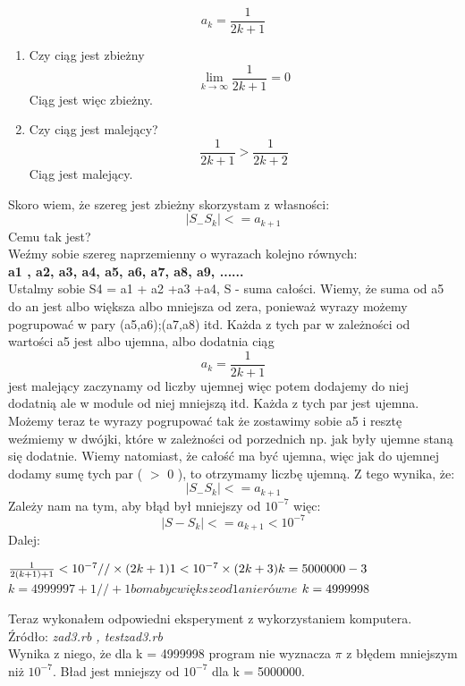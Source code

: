 \documentclass[fleqn]{article}
\begin{document}
\begin{enumerate}
  \[a_{k}=\frac{1}{2k+1}\]
   \begin{enumerate}
   \item Czy ciąg jest zbieżny
   \[\lim_{k \rightarrow \infty}\frac{1}{2k+1} = 0\]
   Ciąg jest więc zbieżny.
   \item Czy ciąg jest malejący?
   \[\frac{1}{2k+1} > \frac{1}{2k+2}\]
   Ciąg jest malejący.
   \end{enumerate}
   Skoro wiem, że szereg jest zbieżny skorzystam z własności:
   \[|S_ - S_{k}| <= a_{k+1}\]
   Cemu tak jest?\\
   Weźmy sobie szereg naprzemienny o wyrazach kolejno równych:\\ \textbf{a1 , a2, a3, a4, a5, a6, a7, a8, a9, ...... } \\
   Ustalmy sobie S4 = a1 + a2 +a3 +a4, S - suma całości. Wiemy, że suma od a5 do an jest albo większa albo mniejsza od zera, ponieważ wyrazy możemy pogrupować w pary (a5,a6);(a7,a8) itd. Każda z tych par w zależności od wartości a5 jest albo ujemna, albo dodatnia ciąg \[a_{k}=\frac{1}{2k+1}\] jest malejący zaczynamy od liczby ujemnej więc potem dodajemy do niej dodatnią ale w module od niej mniejszą itd. Każda z tych par jest ujemna. Możemy teraz te wyrazy pogrupować tak że zostawimy sobie a5 i resztę weźmiemy w dwójki, które w zależności od porzednich np. jak były ujemne staną się dodatnie. Wiemy natomiast, że całość ma być ujemna, więc jak do ujemnej dodamy sumę tych par ( $>$ 0 ), to otrzymamy liczbę ujemną. Z tego wynika, że:\[|S_ - S_{k}| <= a_{k+1}\]
   Zależy nam na tym, aby błąd był mniejszy od $10^{-7}$ więc:
   \[|S - S_{k}| <= a_{k+1} < 10^{-7}\]
   Dalej:\\
   \begin{center}
   $
   \frac{1}{2(k+1)+1} <10^{-7} //\times(2k+1)  \newline
   1 <10^{-7}\times(2k+3) \newline
   k = 5000000 - 3 \newline$ 
   $k = 4999997 + 1 //+1 bo ma byc większe od 1 a nie równe$ \newline
   $k = 4999998  \newline\newline
   $ \end{center}
    Teraz wykonałem odpowiedni eksperyment z wykorzystaniem komputera.\\
    Źródło: \emph{zad3.rb , testzad3.rb} \\
    Wynika z niego, że dla k = 4999998 program nie wyznacza $\pi$ z błędem mniejszym niż $ 10^{-7} $. Bład jest mniejszy od $ 10^{-7} $ dla k = 5000000.

\end{enumerate}
\end{document}
